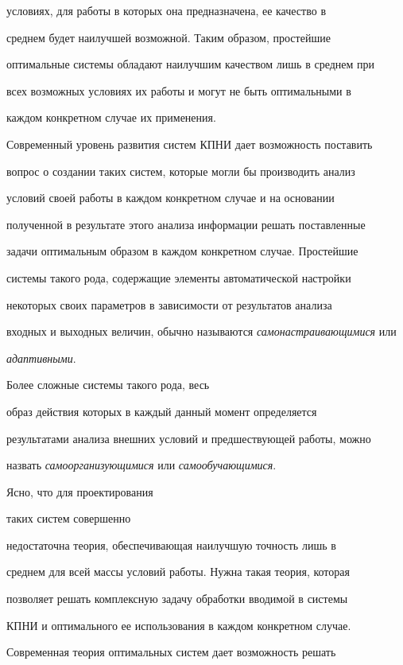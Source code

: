 условиях, для работы в которых она предназначена, ее качество в


среднем будет наилучшей возможной. Таким образом, простейшие


оптимальные системы обладают наилучшим качеством лишь в среднем при


всех возможных условиях их  работы и могут не быть оптимальными в


каждом конкретном случае их применения.





Современный уровень развития систем КПНИ дает возможность поставить


вопрос о создании таких систем, которые могли бы производить анализ


условий своей работы в каждом конкретном случае и на основании


полученной в результате этого анализа информации решать поставленные


задачи оптимальным образом в каждом конкретном случае. Простейшие


системы такого рода, содержащие элементы автоматической настройки


некоторых своих параметров в зависимости от результатов анализа


входных и выходных величин, обычно называются \textit{самонастраивающимися} или 


\textit{адаптивными}.


Более сложные системы такого рода, весь


образ действия которых в каждый данный момент определяется


результатами анализа внешних условий и предшествующей работы, мож\-но


назвать  \textit{самоорганизующимися} или \textit{самообучающимися}.


Ясно, что для проектирования


таких систем совершенно


недостаточна теория, обеспечивающая наилучшую точность лишь  в


среднем для всей массы условий работы. Нужна такая теория, которая


позволяет решать комплексную задачу обработки вводимой в системы


\mbox{КПНИ} и оптимального ее использования в каждом конкретном случае.


Современная теория оптимальных систем дает возможность решать


